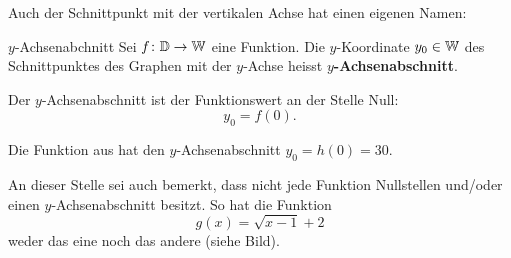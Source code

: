 \begin{bsp}
\begin{center}
    \end{center}


\end{bsp}
Auch der Schnittpunkt mit der vertikalen Achse hat einen eigenen Namen:
\begin{definition}
    {\(y\)-Achsenabchnitt}{}
    Sei \(f\colon \mathbb{D} \to \mathbb{W}\) eine Funktion. Die \(y\)-Koordinate
    \(y_0 \in \mathbb{W}\) des Schnittpunktes des Graphen mit der
    \(y\)-Achse heisst \textbf{\(y\)-Achsenabschnitt}.

    Der \(y\)-Achsenabschnitt ist der Funktionswert an der
    Stelle Null:
    \[
        y_0=f(0).
    \]
\end{definition}
Die Funktion aus  hat den
\(y\)-Achsenabschnitt \(y_0=h(0)=30\).

An dieser Stelle sei auch bemerkt, dass nicht jede Funktion
Nullstellen und/oder einen \(y\)-Achsenabschnitt besitzt.
So hat die Funktion
\[
    g(x)=\sqrt{x-1}+2
\]
weder das eine noch das andere (siehe Bild).

